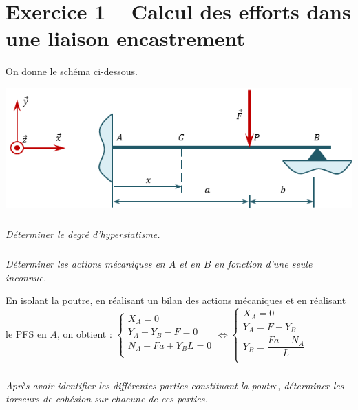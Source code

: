 \documentclass[10pt,fleqn]{article} %
\begin{document}

\vspace{10cm}
\pagestyle{fancy}
\thispagestyle{plain}


\def\columnseprulecolor{\color{ocre}}
\setlength{\columnseprule}{0.4pt} 


\section*{Exercice 1 -- Calcul des efforts dans une liaison encastrement}
\setcounter{subparagraph}{0}
On donne le schéma ci-dessous.
\begin{center}
\includegraphics[width=.45\textwidth]{images/fig_01}
\end{center}

\subparagraph{}
\textit{Déterminer le degré d'hyperstatisme.}

\subparagraph{}
\textit{Déterminer les actions mécaniques en $A$ et en $B$ en fonction d'une seule inconnue.}


\ifprof
\begin{corrige}
En isolant la poutre, en réalisant un bilan des actions mécaniques et en réalisant le PFS en $A$, on obtient : 
$
\left\{
\begin{array}{l}
X_A  = 0 \\
Y_A  +Y_B - F= 0 \\
N_A-Fa+Y_B L = 0 \\
\end{array}
\right.
\Leftrightarrow
\left\{
\begin{array}{l}
X_A = 0 \\
Y_A = F-Y_B \\
Y_B = \dfrac{Fa - N_A}{L} \\
\end{array}
\right.
$

\end{corrige}
\else
\fi



\subparagraph{}
\textit{Après avoir identifier les différentes parties constituant la poutre, déterminer les torseurs de cohésion sur chacune de ces parties.}
\end{document}
